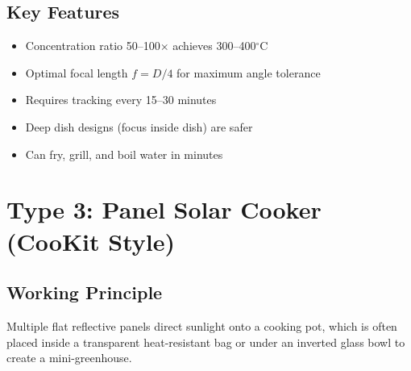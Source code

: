 \documentclass[11pt]{article}
\newcommand{\degC}{$^\circ$C}
\begin{document}
\subsection{Key Features}
\begin{itemize}
    \item Concentration ratio 50--100$\times$ achieves 300--400\degC
    \item Optimal focal length $f = D/4$ for maximum angle tolerance
    \item Requires tracking every 15--30 minutes
    \item Deep dish designs (focus inside dish) are safer
    \item Can fry, grill, and boil water in minutes
\end{itemize}

\newpage
\section{Type 3: Panel Solar Cooker (CooKit Style)}

\subsection{Working Principle}
Multiple flat reflective panels direct sunlight onto a cooking pot, which is often placed inside a transparent heat-resistant bag or under an inverted glass bowl to create a mini-greenhouse.
\end{document}

